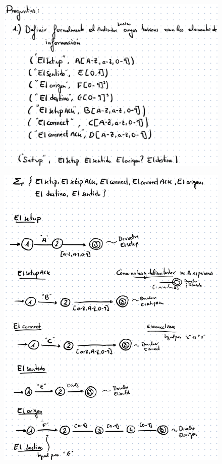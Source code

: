\documentclass[12pt]{report} %
\begin{document}
\begin{figure}[H]
	{\includegraphics[scale=.2]{image-20210305192648153.png}}
\end{figure}

\begin{figure}[H]
	{\includegraphics[scale=.25]{image-20210305192718592.png}}
\end{figure}
\end{document}
